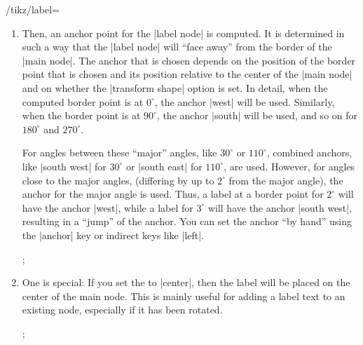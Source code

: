 \begin{key}{/tikz/label=}
\begin{enumerate}
\begin{key}{/tikz/absolute= (default true)}
                The difference can be seen in the following example:
\begin{codeexample}[]
\tikz [rotate=-80,every label/.style={draw,red}]
  ;
\end{codeexample}
\begin{codeexample}[]
\tikz [rotate=-80,every label/.style={draw,red},absolute]
  ;
\end{codeexample}
            \end{key}
        \item Then, an anchor point for the |label node| is computed. It is
            determined in such a way that the |label node| will ``face away''
            from the border of the |main node|. The anchor that is chosen
            depends on the position of the border point that is chosen and its
            position relative to the center of the |main node| and on whether
            the |transform shape| option is set. In detail, when the computed
            border point is at $0^\circ$, the anchor |west| will be used.
            Similarly, when the border point is at $90^\circ$, the anchor
            |south| will be used, and so on for $180^\circ$ and $270^\circ$.

            For angles between these ``major'' angles, like $30^\circ$ or
            $110^\circ$, combined anchors, like |south west| for $30^\circ$ or
            |south east| for $110^\circ$, are used. However, for angles close
            to the major angles, (differing by up to $2^\circ$ from the major
            angle), the anchor for the major angle is used. Thus, a label at a
            border point for $2^\circ$ will have the anchor |west|, while a
            label for $3^\circ$ will have the anchor |south west|, resulting in
            a ``jump'' of the anchor. You can set the anchor ``by hand'' using
            the |anchor| key or indirect keys like |left|.
\begin{codeexample}[]
\tikz
  ;
\end{codeexample}
        \item One  is special: If you set the  to
            |center|, then the label will be placed on the center of the main
            node. This is mainly useful for adding a label text to an existing
            node, especially if it has been rotated.
\begin{codeexample}[]
\tikz {};
\end{codeexample}
    \end{enumerate}


\end{key}
